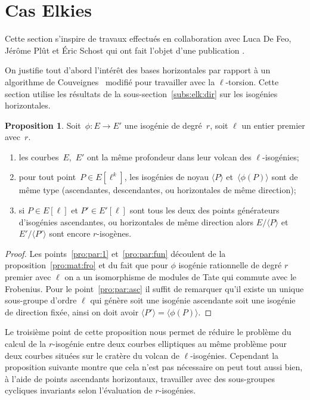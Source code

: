 \documentclass[10pt,a4paper]{book}
\theoremstyle{plain}
\theoremstyle{definition}
\theoremstyle{definition}
\theoremstyle{definition}
\theoremstyle{definition}
\newtheorem{prop}[thm]{Proposition}
\theoremstyle{definition}
\theoremstyle{remark}
\theoremstyle{remark}
\theoremstyle{definition}
\begin{document}
\section{Cas Elkies}
\label{sec:cou:elk}
 Cette section s'inspire de travaux effectués en collaboration avec Luca De Feo,
J\'er\^ome Pl\^ut et \'Eric Schost qui ont fait l'objet d'une publication 
\cite{Defeo_Plut_Schost_2016}. 

On justifie tout d'abord l'intérêt des bases horizontales par rapport à un 
algorithme de Couveignes~\cite{Couveignes96} modifié pour travailler avec la
$\ell$-torsion. Cette section utilise les résultats de la 
sous-section~\ref{subs:elk:dir} sur les isogénies horizontales.

\begin{prop}\label{pro:par:iso}
Soit~$\phi: E \rightarrow E'$ une isogénie de degré~$r$, soit $\ell$ un entier 
premier avec~$r$.
\begin{enumerate}
\item\label{pro:par:1} les courbes~$E$,~$E'$ ont la même profondeur dans leur volcan des
 $\ell$-isogénies;
\item\label{pro:par:fun} pour tout point~$P \in E[\ell^k]$,
les isogénies de noyau $\langle P \rangle$ et~$\langle \phi(P) \rangle$ sont de même type
(ascendantes, descendantes, ou horizontales de même direction);
\item\label{pro:par:asc} si $P \in E[\ell]$ et $P' \in E'[\ell]$ sont tous les 
deux des points générateurs d'isogénies ascendantes, ou horizontales de même 
direction alors $E/\langle P \rangle$ et~$E'/\langle P' \rangle$ sont encore $r$-isogènes.
\end{enumerate}
\end{prop}

\begin{proof}
Les points~\eqref{pro:par:1} et~\eqref{pro:par:fun} découlent de la 
proposition~\ref{pro:mat:fro} et du fait que pour $\phi$ isogénie rationnelle 
de degré $r$ premier avec $\ell$ on a un isomorphisme de modules de Tate qui 
commute avec le Frobenius. Pour le point~\eqref{pro:par:asc} il suffit de 
remarquer qu'il existe un unique sous-groupe d'ordre $\ell$ qui génère soit une
isogénie ascendante soit une isogénie de direction fixée, ainsi on doit avoir 
$\langle P' \rangle=\langle \phi(P) \rangle$.

\end{proof}
Le troisième point de cette proposition nous permet de réduire le problème du 
calcul de la $r$-isogénie entre deux courbes elliptiques au même problème pour 
deux courbes situées sur le cratère du volcan de $\ell$-isogénies. Cependant la
proposition suivante montre que cela n'est pas nécessaire on peut tout aussi 
bien, à l'aide de points ascendants horizontaux, travailler avec des 
sous-groupes cycliques invariants selon l'évaluation de $r$-isogénies. 
\end{document}
